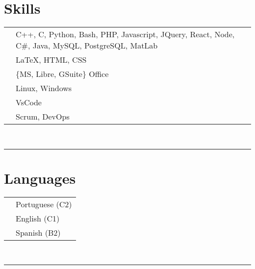 \documentclass[oneside]{article}
\begin{document}
{\begin{minipage}[t][\textheight-2\fboxsep-2\fboxrule][t]{\dimexpr0.40\textwidth-2\fboxrule-2\fboxsep\relax}
        \section*{\large Skills}
        \begin{tabularx}{\textwidth}{cY}
            \faCode{}        & C++, C, Python, Bash, PHP, Javascript, JQuery, React, Node, C\#, Java, MySQL, PostgreSQL, MatLab \\
            \faPen*{}        & \LaTeX, HTML, CSS \\
            \faFont{}        & \{MS, Libre, GSuite\} Office \\
            \faCogs{}        & Linux, Windows \\
            \faLaptopCode{}  & VsCode \\
            \faToolbox{}     & Scrum, DevOps
        \end{tabularx}
        \vspace{1pt} \\
        \rule{\linewidth}{0.4pt}
        \section*{\large Languages}
        \begin{tabular}{cl}
            \faLanguage{} & Portuguese (C2) \\
            \faLanguage{} & English (C1) \\
            \faLanguage{} & Spanish (B2) 
        \end{tabular}
        \vspace{.3cm}
        \\
        \rule{\linewidth}{0.4pt}
        \\

    \end{minipage}
}
\hfill
\end{document}
